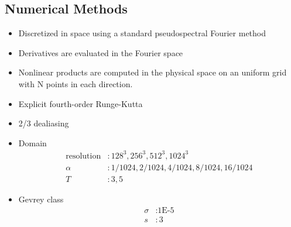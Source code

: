 \documentclass{beamer}
\def\Bmp#1{ \begin{minipage}{#1} }
\def\Emp{ \end{minipage} }
\begin{document}
\subsection{Numerical Methods}


\frame
{
\hspace*{-1.0cm}
\Bmp{12cm}
\raggedright

\begin{itemize}

\item<1->
Discretized in space using a standard pseudospectral Fourier method 

\item<2->
Derivatives are evaluated in the Fourier
space

\item<3->
Nonlinear products are computed in the physical space on an uniform
grid with N points in each direction.

\item<4->
Explicit fourth-order Runge-Kutta

\item<5->
2/3 dealiasing

\item<6->
Domain
\vspace{-0.25cm}
\begin{subequations}
\begin{align*}
\text{resolution}&: 128^3, 256^3, 512^3, 1024^3 \\
\alpha&: 1/1024, 2/1024, 4/1024, 8/1024, 16/1024 \\
T&: 3,5
\end{align*}
\end{subequations}
\vspace*{-1cm}
\item<7->
Gevrey class
\vspace{-0.25cm}
\begin{subequations}
\begin{align*}
\sigma&: \text{1E-5}\\
s&: 3
\end{align*}
\end{subequations}

\end{itemize}
\Emp
}
\end{document}
